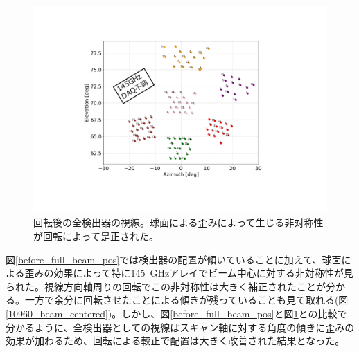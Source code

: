 \begin{figure}[htbp]
  \centering
  \includegraphics[width=0.9\columnwidth]{5_alignment/figs/after_full_pos_70_mod.pdf}
  \caption{回転後の全検出器の視線。球面による歪みによって生じる非対称性が回転によって是正された。}
  \label{after_full_pos_70}
\end{figure}
図\ref{before_full_beam_pos}では検出器の配置が傾いていることに加えて、球面による歪みの効果によって特に\SI{145}{GHz}アレイでビーム中心に対する非対称性が見られた。視線方向軸周りの回転でこの非対称性は大きく補正されたことが分かる。一方で余分に回転させたことによる傾きが残っていることも見て取れる(図\ref{10960_beam_centered})。しかし、図\ref{before_full_beam_pos}と図\ref{after_full_pos_70}との比較で分かるように、全検出器としての視線はスキャン軸に対する角度の傾きに歪みの効果が加わるため、回転による較正で配置は大きく改善された結果となった。

